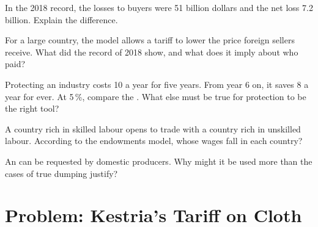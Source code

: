 \begin{exercise}[$\star\star$]\label{exo:g12:trade-and-trade-policy:11}
In the 2018 record, the losses to buyers were 51 billion dollars and the net loss 7.2 billion. Explain the difference.
\end{exercise}

\begin{exercise}[$\star\star\star$]\label{exo:g12:trade-and-trade-policy:12}
For a large country, the model allows a tariff to lower the price foreign sellers receive. What did the record of 2018 show, and what does it imply about who paid?
\end{exercise}

\begin{exercise}[$\star\star\star$]\label{exo:g12:trade-and-trade-policy:13}
Protecting an industry costs 10 a year for five years. From year 6 on, it saves 8 a year for ever. At 5\,\%, compare the . What else must be true for protection
to be the right tool?
\end{exercise}

\begin{exercise}[$\star\star\star$]\label{exo:g12:trade-and-trade-policy:14}
A country rich in skilled labour opens to trade with a country rich in unskilled labour. According to the endowments model, whose wages fall in each country?
\end{exercise}

\begin{exercise}[$\star\star\star$]\label{exo:g12:trade-and-trade-policy:15}
An  can be requested by domestic producers. Why might it be used more than the cases of true dumping justify?
\end{exercise}

\section{Problem: Kestria's Tariff on Cloth}

